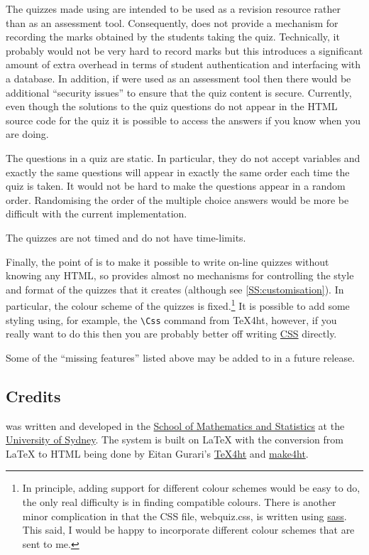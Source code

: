 \documentclass[svgnames]{article}
\begin{document}
    The quizzes made using \WebQuiz are intended to be used as a
    revision resource rather than as an assessment tool. Consequently,
    \WebQuiz does not provide a mechanism for recording the marks
    obtained by the students taking the quiz. Technically, it probably
    would not be very hard to record marks but this introduces a
    significant amount of extra overhead in terms of student
    authentication and interfacing with a database. In addition, if
    \WebQuiz were used as an assessment tool then there would be
    additional ``security issues'' to ensure that the quiz content is
    secure. Currently, even though the solutions to the quiz questions
    do not appear in the HTML source code for the quiz it is possible to
    access the answers if you know when you are doing.

    The questions in a \WebQuiz quiz are static. In particular, they do
    not accept variables and exactly the same questions will appear in
    exactly the same order each time the quiz is taken. It would not be
    hard to make the questions appear in a random order. Randomising the
    order of the multiple choice answers would be more be difficult with
    the current implementation.

    The quizzes are not timed and do not have time-limits.

    Finally, the point of \WebQuiz is to make it possible to write
    on-line quizzes without knowing any HTML, so \WebQuiz provides
    almost no mechanisms for controlling the style and format of the
    quizzes that it creates (although see \autoref{SS:customisation}).
    In particular, the colour scheme of the quizzes is
    fixed.\footnote{In principle, adding support for different colour
    schemes would be easy to do, the only real difficulty is in finding
    compatible colours. There is another minor complication in that the
    \WebQuiz CSS file, \textsf{webquiz.css}, is written using
    \href{http://sass-lang.com/}{sass}. This said, I would be happy to
    incorporate different colour schemes that are sent to me.}
    It is possible to add some styling using, for example, the
    \Verb|\Css| command from \TeX4ht, however, if you really want
    to do this then you are probably better off writing
    \href{https://www.w3schools.com/css/}{CSS} directly.

    Some of the ``missing features'' listed above may be added to \WebQuiz in a future release.

\subsection{Credits}
    \WebQuiz{} was written and developed in the
    \href{http://www.maths.usyd.edu.au/}{School of Mathematics and
    Statistics} at the \href{http://www.usyd.edu.au/}{University of
    Sydney}.  The system is built on \LaTeX{} with the conversion from
    \LaTeX{} to HTML being done by Eitan Gurari's
    \href{http://www.cis.ohio-state.edu/~gurari/TeX4ht/mn.html}{TeX4ht}
    and
    \href{https://github.com/michal-h21/make4ht}{make4ht}.
\end{document}
